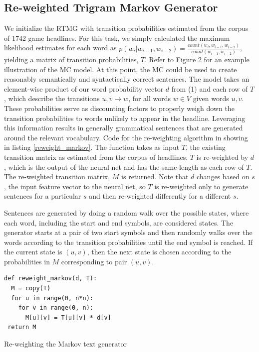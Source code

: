 \documentclass[12pt, journal]{IEEEtran}
\begin{document}
\subsection{Re-weighted Trigram Markov Generator}
We initialize the RTMG with transition probabilities estimated from the corpus of 1742 game headlines. For this task, we simply calculated the maximum likelihood estimates for each word as $p(w_i|w_{i-1},w_{i-2}) = \frac{count(w_i, w_{i-1}, w_{i-2})}{count(w_{i-1},w_{i-2})}$, yielding a matrix of transition probabilities, $T$. Refer to Figure 2 for an example illustration of the MC model. At this point, the MC could be used to create reasonably semantically and syntactically correct sentences. The model takes an element-wise product of our word probability vector $d$ from (1) and each row of $T$, which describe the transitions $u, v \rightarrow w$, for all words $w \in V$ given words $u, v$. These probabilities serve as discounting factors to properly weigh down the transition probabilities to words unlikely to appear in the headline. Leveraging this information results in generally grammatical sentences that are generated around the relevant vocabulary. Code for the re-weighting algorithm in showing in listing \ref{reweight_markov}. The function takes as input $T$, the existing transition matrix as estimated from the corpus of headlines. $T$ is re-weighted by $d$, which is the output of the neural net and has the same length as each row of $T$. The re-weighted transition matrix, $M$ is returned. Note that $d$ changes based on $s$, the input feature vector to the neural net, so $T$ is re-weighted only to generate sentences for a particular $s$ and then re-weighted differently for a different $s$.

Sentences are generated by doing a random walk over the possible states, where each word, including the start and end symbols, are considered states. The generator starts at a pair of two start symbols and then randomly walks over the words according to the transition probabilities until the end symbol is reached. If the current state is $(u,v)$, then the next state is chosen according to the probabilities in $M$ corresponding to pair $(u,v)$.

\begin{listing}[H]
\begin{verbatim}
def reweight_markov(d, T):
  M = copy(T)
  for u in range(0, n*n):
    for v in range(0, n):
      M[u][v] = T[u][v] * d[v]
 return M
\end{verbatim}
\caption{Re-weighting the Markov text generator}
\label{reweight_markov}
\end{listing}
\end{document}
